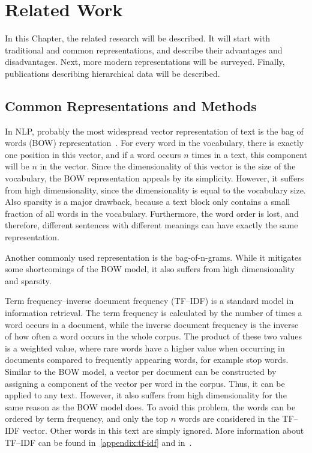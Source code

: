 \chapter{Related Work}\label{related-work}

In this Chapter, the related research will be described. It will start with traditional and common representations, and describe their advantages and disadvantages. Next, more modern representations will be surveyed. Finally, publications describing hierarchical data will be described.

\section{Common Representations and Methods}

In NLP, probably the most widespread vector representation of text is the bag of words (BOW) representation~\cite{Harris1954}. For every word in the vocabulary, there is exactly one position in this vector, and if a word occurs $n$ times in a text, this component will be $n$ in the vector. Since the dimensionality of this vector is the size of the vocabulary, the BOW representation appeals by its simplicity. However, it suffers from high dimensionality, since the dimensionality is equal to the vocabulary size. Also sparsity is a major drawback, because a text block only contains a small fraction of all words in the vocabulary. Furthermore, the word order is lost, and therefore, different sentences with different meanings can have exactly the same representation.

Another commonly used representation is the bag-of-n-grams. While it mitigates some shortcomings of the BOW model, it also suffers from high dimensionality and sparsity.

Term frequency--inverse document frequency (TF--IDF) is a standard model in information retrieval. The term frequency is calculated by the number of times a word occurs in a document, while the inverse document frequency is the inverse of how often a word occurs in the whole corpus. The product of these two values is a weighted value, where rare words have a higher value when occurring in documents compared to frequently appearing words, for example stop words. Similar to the BOW model, a vector per document can be constructed by assigning a component of the vector per word in the corpus. Thus, it can be applied to any text. However, it also suffers from high dimensionality for the same reason as the BOW model does. To avoid this problem, the words can be ordered by term frequency, and only the top $n$ words are considered in the TF--IDF vector. Other words in this text are simply ignored. More information about TF--IDF can be found in~\ref{appendix:tf-idf} and in~\cite{Wu2008}.

